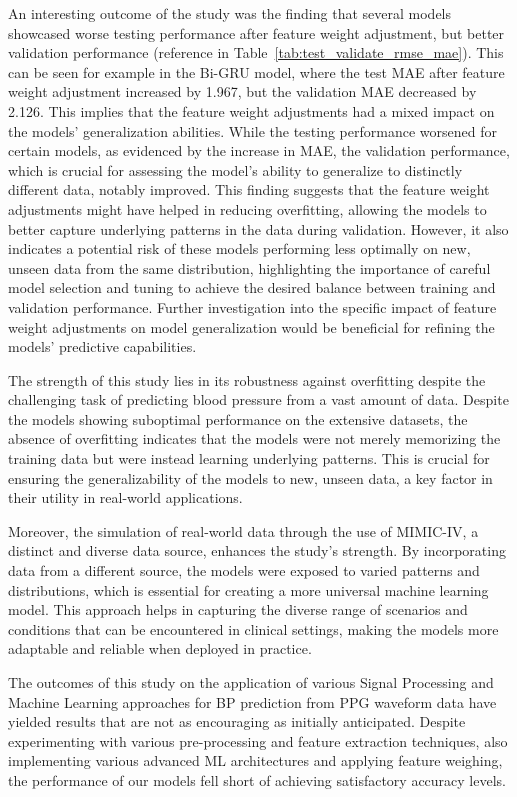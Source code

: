 An interesting outcome of the study was the finding that several models showcased worse testing performance after feature weight adjustment, but better validation performance (reference in Table~\ref{tab:test_validate_rmse_mae}).
This can be seen for example in the Bi-GRU model, where the test MAE after feature weight adjustment increased by 1.967, but the validation MAE decreased by 2.126.
This implies that the feature weight adjustments had a mixed impact on the models' generalization abilities.
While the testing performance worsened for certain models, as evidenced by the increase in MAE, the validation performance,
which is crucial for assessing the model's ability to generalize to distinctly different data, notably improved.
This finding suggests that the feature weight adjustments might have helped in reducing overfitting, allowing the models to better capture underlying patterns in the data during validation.
However, it also indicates a potential risk of these models performing less optimally on new, unseen data from the same distribution,
highlighting the importance of careful model selection and tuning to achieve the desired balance between training and validation performance.
Further investigation into the specific impact of feature weight adjustments on model generalization would be beneficial for refining the models' predictive capabilities.

The strength of this study lies in its robustness against overfitting despite the challenging task of predicting blood pressure from a vast amount of data.
Despite the models showing suboptimal performance on the extensive datasets, the absence of overfitting indicates that the models were not merely memorizing the training data but were instead learning underlying patterns.
This is crucial for ensuring the generalizability of the models to new, unseen data, a key factor in their utility in real-world applications.

Moreover, the simulation of real-world data through the use of MIMIC-IV, a distinct and diverse data source, enhances the study's strength.
By incorporating data from a different source, the models were exposed to varied patterns and distributions, which is essential for creating a more universal machine learning model.
This approach helps in capturing the diverse range of scenarios and conditions that can be encountered in clinical settings, making the models more adaptable and reliable when deployed in practice.

\vspace{1cm}

The outcomes of this study on the application of various Signal Processing and Machine Learning approaches for BP prediction from PPG waveform data have yielded results that are not as encouraging as initially anticipated.
Despite experimenting with various pre-processing and feature extraction techniques, also implementing various advanced ML architectures and applying feature weighing, the performance of our models fell short of achieving satisfactory accuracy levels.